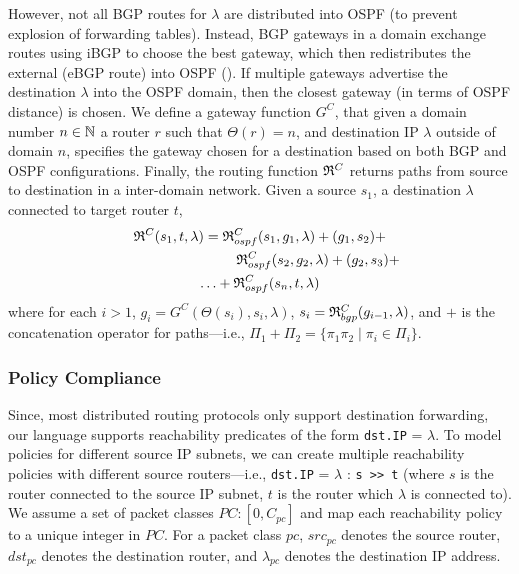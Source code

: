 However, not all BGP routes for $\lambda$
are distributed 
into OSPF (to prevent explosion of forwarding tables). Instead,
BGP gateways in a domain exchange routes using iBGP to choose
the best gateway, which then redistributes the external
(eBGP route) into OSPF (). If multiple
gateways advertise the destination $\lambda$ into the OSPF 
domain, then the closest gateway (in terms of OSPF distance)
is chosen. We define a gateway function $G^C$,
that given a domain number $n\in \mathbb{N}$
a router $r$ such that $\Theta(r)=n$,
and destination IP $\lambda$ outside of domain $n$, specifies the
gateway chosen for a destination based on both BGP and OSPF
configurations. 
Finally, the routing function 
$\mathfrak{R}^C$
returns paths from source to destination in a inter-domain network. 
Given a source $s_1$, a destination $\lambda$ connected to target router $t$, 
\begin{multline}
	\mathfrak{R}^C(s_1, t, \lambda) = 
	\mathfrak{R}_{ospf}^C(s_1,g_1, \lambda) + 
	 (g_1, s_2 )+ \\
	~~~~~~~~~~~~~~~~~~~~~~~~~\mathfrak{R}_{ospf}^C(s_2,g_2, \lambda) + (g_2, s_3) + \\
	\ldots  +\mathfrak{R}_{ospf}^C(s_n,t,\lambda)
\end{multline}
where for each $i>1$, $g_i=G^C(\Theta(s_i),s_i,\lambda)$, 
$s_i=\mathfrak{R}_{bgp}^C(g_{i-1}, \lambda)$,
and  $+$ is the concatenation operator for paths---i.e.,
$\Pi_1+\Pi_2=\{\pi_1\pi_2\mid \pi_i\in\Pi_i\}$.



\subsubsection{Policy Compliance}
Since, most distributed routing protocols only support
destination forwarding, our language supports reachability predicates 
of the form \texttt{dst.IP} = $\lambda$. To 
model policies for different source IP subnets, we can create
multiple reachability policies with different source routers---i.e.,
\texttt{dst.IP} = $\lambda$ : \texttt{s >> t} (where $s$ is
the router connected to the source IP subnet, $t$ is the router
which $\lambda$ is connected to).
We assume a set of packet classes $PC : [0,C_{pc}]$ 
and map each reachability policy to a unique integer in $PC$.
For a packet class $pc$, $src_{pc}$ denotes the source router,
$dst_{pc}$ denotes the destination router, and $\lambda_{pc}$
denotes the destination IP address. 

